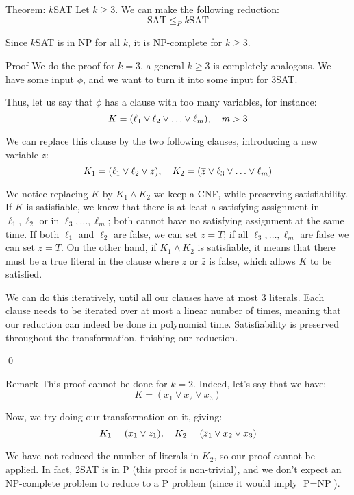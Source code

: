 \documentclass[a4paper]{article}
\begin{document}
\begin{parag}{Theorem: $k$SAT}
    Let $k \geq 3$. We can make the following reduction: 
    \[\text{SAT} \leq_P \text{$k$SAT}\]

    Since $k$SAT is in NP for all $k$, it is NP-complete for $k \geq 3$.
    
    \begin{subparag}{Proof}
        We do the proof for $k = 3$, a general $k \geq 3$ is completely analogous. We have some input $\phi$, and we want to turn it into some input for 3SAT. 

        Thus, let us say that $\phi$ has a clause with too many variables, for instance: 
        \[K = \left(\ell _1 \lor \ell _2 \lor \ldots \lor \ell _m\right), \mathspace m > 3\]
        
        We can replace this clause by the two following clauses, introducing a new variable $z$: 
        \[K_1 = \left(\ell _1 \lor \ell _2 \lor z\right), \mathspace K_2 = \left(\bar{z} \lor \ell _3 \lor \ldots \lor \ell _m\right)\]
        
        We notice replacing $K$ by $K_1 \land K_2$ we keep a CNF, while preserving satisfiability. If $K$ is satisfiable, we know that there is at least a satisfying assignment in $\ell_1, \ell _2$ or in $\ell_3, \ldots, \ell_m$; both cannot have no satisfying assignment at the same time. If both $\ell _1$ and $\ell _2$ are false, we can set $z = T$; if all $\ell _3, \ldots, \ell _m$ are false we can set $\bar{z} = T$. On the other hand, if $K_1 \land K_2$ is satisfiable, it means that there must be a true literal in the clause where $z$ or $\bar{z}$ is false, which allows $K$ to be satisfied.

        We can do this iteratively, until all our clauses have at most 3 literals. Each clause needs to be iterated over at most a linear number of times, meaning that our reduction can indeed be done in polynomial time. Satisfiability is preserved throughout the transformation, finishing our reduction.

        \qed
    \end{subparag}

    \begin{subparag}{Remark}
        This proof cannot be done for $k = 2$. Indeed, let's say that we have: 
        \[K = \left(x_1 \lor x_2 \lor x_3\right)\]
        
        Now, we try doing our transformation on it, giving: 
        \[K_1 = \left(x_1 \lor z_1\right), \mathspace K_2 = \left(\bar{z}_1 \lor x_2 \lor x_3\right)\] 
        
        We have not reduced the number of literals in $K_2$, so our proof cannot be applied. In fact, 2SAT is in P (this proof is non-trivial), and we don't expect an NP-complete problem to reduce to a P problem (since it would imply $\text{P} = \text{NP}$).
    \end{subparag}
\end{parag}
\end{document}
